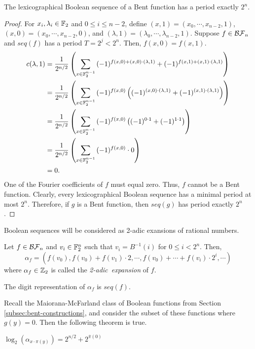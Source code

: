 \begin{theorem}
  The lexicographical Boolean sequence of a Bent function has a period
  exactly $2^n$.
\end{theorem}
\begin{proof}
  For $x_i,\lambda_i\in\mathbb{F}_2$ and $0\leq i\leq n-2$, define
  $(x,1)=\allowbreak(x_0,\cdots,\allowbreak x_{n-2},1)$,
  $(x,0)=\allowbreak(x_0,\cdots,\allowbreak x_{n-2},0)$, and
  $(\lambda,1)=\allowbreak(\lambda_0,\cdots,\allowbreak \lambda_{n-2},1)$.
  Suppose $f\in\mathcal{BF}_n$ and $seq(f)$ has a period $T=2^j<2^n$. Then,
  $f(x,0)=f(x,1)$.
  \begin{align*}
    c(\lambda,1)&=\frac{1}{2^{n/2}}
      \left(\sum_{x\in\mathbb{F}_2^{n-1}}
        {(-1)^{f(x,0)+(x,0)\cdot(\lambda,1)}+
        (-1)^{f(x,1)+(x,1)\cdot(\lambda,1)}}
      \right)\\
    &=\frac{1}{2^{n/2}}
      \left(\sum_{x\in\mathbb{F}_2^{n-1}}
        {(-1)^{f(x,0)}\left((-1)^{(x,0)\cdot(\lambda,1)}+
        (-1)^{(x,1)\cdot(\lambda,1)}\right)}
      \right)\\
    &=\frac{1}{2^{n/2}}
      \left(\sum_{x\in\mathbb{F}_2^{n-1}}
      {(-1)^{f(x,0)}\left((-1)^{0\cdot1}+(-1)^{1\cdot1}\right)}
      \right)\\
    &=\frac{1}{2^{n/2}}
      \left(\sum_{x\in\mathbb{F}_2^{n-1}}{(-1)^{f(x,0)}\cdot0}\right)\\
    &=0.
  \end{align*}
  One of the Fourier coefficients of $f$ must equal zero. Thus, $f$ cannot
  be a Bent function. Clearly, every lexicographical Boolean sequence has a
  minimal period at most $2^n$. Therefore, if $g$ is a Bent function, then
  $seq(g)$ has period exactly $2^n$.
\end{proof}

\par Boolean sequences will be considered as 2-adic exansions of rational
numbers.

\begin{definition}\label{2-adic-ex}
  Let $f\in\mathcal{BF}_n$ and $v_i\in\mathbb{F}_2^n$ such that $v_i=B^{-1}(i)$ for
  $0\leq i<2^n$. Then,
  \begin{equation}
    \alpha_f=(f(v_0),f(v_0)+f(v_1)\cdot2,\cdots,\allowbreak
      f(v_0)+\cdots\allowbreak+f(v_i)\cdot2^i,\allowbreak\cdots)
  \end{equation}
  where $\alpha_f\in\mathbb{Z}_2$ is called the {\em 2-adic\ expansion} of $f$.
\end{definition}

\begin{lemma}
  The digit representation of $\alpha_f$ is $seq(f)$.
\end{lemma}

\par Recall the Maiorana-McFarland class of Boolean functions from Section
\ref{subsec:bent-constructions}, and consider
the subset of these functions where $g(y)=0$. Then the following theorem is
true.

\begin{theorem}
  $\log_2(\alpha_{x\cdot\pi(y)})=2^{n/2}+2^{\bar{\pi}(0)}$
\end{theorem}
